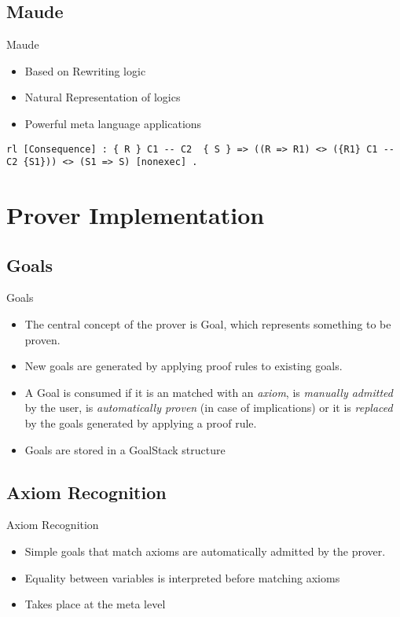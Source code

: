 \documentclass{beamer}
\begin{document}
\subsection{Maude}
\begin{frame}[fragile]{Maude}
\begin{itemize}
	\item Based on Rewriting logic
	\item {Natural Representation of logics}
	\item Powerful meta language applications
\end{itemize}
\begin{example}
	\begin{lstlisting}
rl [Consequence] : { R } C1 -- C2  { S } => ((R => R1) <> ({R1} C1 -- C2 {S1})) <> (S1 => S) [nonexec] .
\end{lstlisting}
\end{example}
\end{frame}

\section{Prover Implementation}
\subsection{Goals}
\begin{frame}{Goals}
\begin{itemize}
	\item The central concept of the prover is \alert{Goal}, which represents something to be proven.
	\item New goals are generated by applying proof rules to existing goals. 
	\item A \alert{Goal} is consumed if it is an matched with an \textit{axiom}, is \textit{manually admitted} by the user, is \textit{automatically proven} (in case of implications) or it is \textit{replaced} by the goals generated by applying a proof rule. 
	\item Goals are stored in a \alert{GoalStack} structure
\end{itemize}
\end{frame}

\subsection{Axiom Recognition}
\begin{frame}{Axiom Recognition}
\begin{itemize}
	\item Simple goals that match \alert{axioms} are automatically admitted by the prover.
	\item Equality between variables is \alert{interpreted} before matching axioms
	\item Takes place at the meta level
\end{itemize}
\end{frame}
\end{document}
